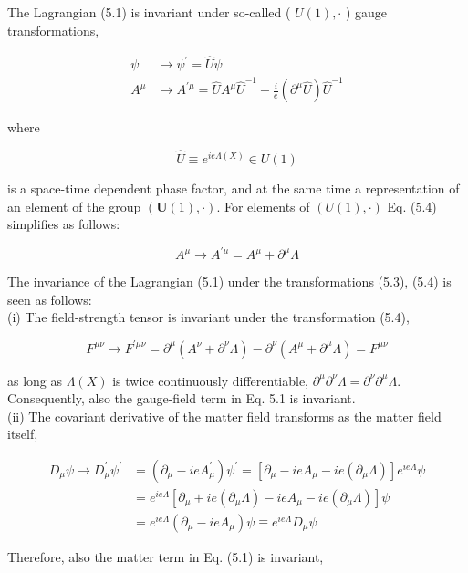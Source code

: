 \documentclass[10pt, letterpaper]{article}
\begin{document}
The Lagrangian (5.1) is invariant under so-called ( $U(1), \cdot$ ) gauge transformations,

$$
\begin{aligned}
\psi & \longrightarrow \psi^{\prime}=\hat{U} \psi \\
A^{\mu} & \longrightarrow A^{\prime \mu}=\hat{U} A^{\mu} \hat{U}^{-1}-\frac{i}{e}\left(\partial^{\mu} \hat{U}\right) \hat{U}^{-1}
\end{aligned}
$$

where

$$
\hat{U} \equiv e^{i e \Lambda(X)} \in U(1)
$$

is a space-time dependent phase factor, and at the same time a representation of an element of the group $(\boldsymbol{U}(1), \cdot)$. For elements of $(U(1), \cdot)$ Eq. (5.4) simplifies as follows:

$$
A^{\mu} \longrightarrow A^{\prime \mu}=A^{\mu}+\partial^{\mu} \Lambda
$$

The invariance of the Lagrangian (5.1) under the transformations (5.3), (5.4) is seen as follows:\\
(i) The field-strength tensor is invariant under the transformation (5.4),

$$
F^{\mu \nu} \longrightarrow F^{\prime \mu \nu}=\partial^{\mu}\left(A^{\nu}+\partial^{\nu} \Lambda\right)-\partial^{\nu}\left(A^{\mu}+\partial^{\mu} \Lambda\right)=F^{\mu \nu}
$$

as long as $\Lambda(X)$ is twice continuously differentiable, $\partial^{\mu} \partial^{\nu} \Lambda=\partial^{\nu} \partial^{\mu} \Lambda$. Consequently, also the gauge-field term in Eq. 5.1 is invariant.\\
(ii) The covariant derivative of the matter field transforms as the matter field itself,

$$
\begin{aligned}
D_{\mu} \psi \longrightarrow D_{\mu}^{\prime} \psi^{\prime} & =\left(\partial_{\mu}-i e A_{\mu}^{\prime}\right) \psi^{\prime}=\left[\partial_{\mu}-i e A_{\mu}-i e\left(\partial_{\mu} \Lambda\right)\right] e^{i e \Lambda} \psi \\
& =e^{i e \Lambda}\left[\partial_{\mu}+i e\left(\partial_{\mu} \Lambda\right)-i e A_{\mu}-i e\left(\partial_{\mu} \Lambda\right)\right] \psi \\
& =e^{i e \Lambda}\left(\partial_{\mu}-i e A_{\mu}\right) \psi \equiv e^{i e \Lambda} D_{\mu} \psi
\end{aligned}
$$

Therefore, also the matter term in Eq. (5.1) is invariant,
\end{document}
